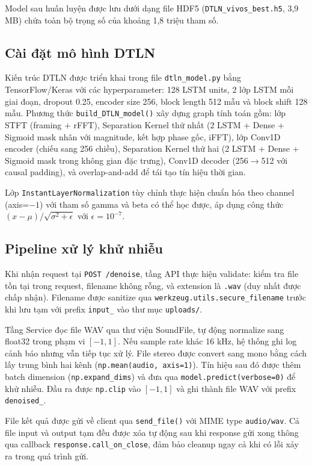 {Model sau huấn luyện được lưu dưới dạng file HDF5
(\texttt{DTLN\_vivos\_best.h5}, 3,9 MB) chứa toàn bộ trọng số của
khoảng 1,8 triệu tham số.

\subsection{Cài đặt mô hình DTLN}

Kiến trúc DTLN được triển khai trong file \texttt{dtln\_model.py} bằng
TensorFlow/Keras với các hyperparameter: 128 LSTM units, 2 lớp LSTM mỗi
giai đoạn, dropout 0.25, encoder size 256, block length 512 mẫu và
block shift 128 mẫu. Phương thức \texttt{build\_DTLN\_model()} xây dựng
graph tính toán gồm: lớp STFT (framing + rFFT), Separation Kernel thứ nhất
(2 LSTM + Dense + Sigmoid mask nhân với magnitude, kết hợp phase gốc, iFFT),
lớp Conv1D encoder (chiếu sang 256 chiều), Separation Kernel thứ hai
(2 LSTM + Dense + Sigmoid mask trong không gian đặc trưng), Conv1D decoder
(256$\rightarrow$512 với causal padding), và overlap-and-add để tái tạo
tín hiệu thời gian.

Lớp \texttt{InstantLayerNormalization} tùy chỉnh thực hiện chuẩn hóa
theo channel (axis=$-1$) với tham số gamma và beta có thể học được,
áp dụng công thức $(x - \mu) / \sqrt{\sigma^2 + \epsilon}$ với
$\epsilon = 10^{-7}$.

\subsection{Pipeline xử lý khử nhiễu}

Khi nhận request tại \texttt{POST /denoise}, tầng API thực hiện validate:
kiểm tra file tồn tại trong request, filename không rỗng, và extension là
\texttt{.wav} (duy nhất được chấp nhận). Filename được sanitize qua
\texttt{werkzeug.utils.secure\_filename} trước khi lưu tạm với prefix
\texttt{input\_} vào thư mục \texttt{uploads/}.

Tầng Service đọc file WAV qua thư viện SoundFile, tự động normalize sang
float32 trong phạm vi $[-1, 1]$. Nếu sample rate khác 16 kHz, hệ thống
ghi log cảnh báo nhưng vẫn tiếp tục xử lý. File stereo được convert sang
mono bằng cách lấy trung bình hai kênh (\texttt{np.mean(audio, axis=1)}).
Tín hiệu sau đó được thêm batch dimension (\texttt{np.expand\_dims}) và
đưa qua \texttt{model.predict(verbose=0)} để khử nhiễu. Đầu ra được
\texttt{np.clip} vào $[-1, 1]$ và ghi thành file WAV với prefix
\texttt{denoised\_}.

File kết quả được gửi về client qua \texttt{send\_file()} với MIME type
\texttt{audio/wav}. Cả file input và output tạm đều được xóa tự động
sau khi response gửi xong thông qua callback \texttt{response.call\_on\_close},
đảm bảo cleanup ngay cả khi có lỗi xảy ra trong quá trình gửi.

}
